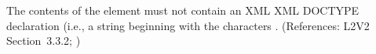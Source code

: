 The contents of the  element must not contain an XML XML
DOCTYPE declaration (i.e., a string beginning with the characters
.  (References: L2V2 Section~3.3.2;
)
